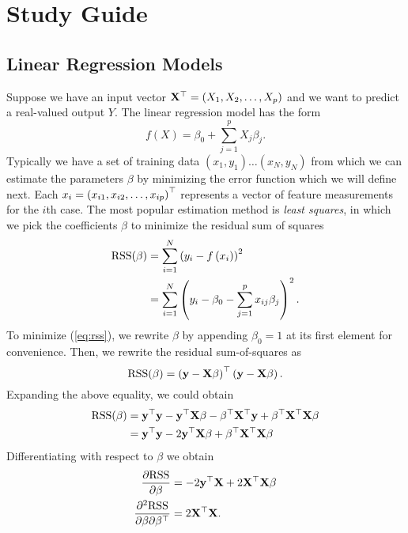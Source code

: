 \documentclass[info, crop, draft]{templates/Base}
\begin{document}
\chapter{Study Guide}
\section{Linear Regression Models}
Suppose we have an input vector ${\mathbf{X}}^\top = \left( X_1, X_2, \ldots, X_p \right)$ and we
want to predict a real-valued output $Y$. The linear regression model has the
form
\begin{equation}
    f(X) = \beta_0 + \sum_{j=1}^{p}X_j\beta_j.
\end{equation}
Typically we have a set of training data $(x_1, y_1) \ldots (x_N, y_N)$ from which
we can estimate the parameters $\beta$ by minimizing the error function which we
will define next. Each $x_i = \left( x_{i1}, x_{i2}, \ldots, x_{ip} \right)^\top$ represents
a vector of feature measurements for the $i$th case. The most popular estimation
method is \textit{least squares}, in which we pick the coefficients $\beta$ to
minimize the residual sum of squares
\begin{gather}
  \label{eq:rss}
  \begin{aligned}
    \text{RSS}(\beta) &= \sum_{i=1}^{N}\left( y_i - f\left( x_i \right) \right)^2 \\
    &= \sum_{i=1}^{N}\left(  y_i - \beta_0 - \sum_{j=1}^{p}x_{ij}\beta_j \right)^2.
  \end{aligned}
\end{gather}
To minimize (\ref{eq:rss}), we rewrite $\beta$ by appending $\beta_0 = 1$ at its
first element for convenience. Then, we rewrite the residual sum-of-squares as
\begin{equation}
  \text{RSS}(\beta) = \left( {\mathbf{y}} - {\mathbf{X}} \beta \right)^\top \left( {\mathbf{y}} - {\mathbf{X}} \beta \right).
\end{equation}
Expanding the above equality, we could obtain
\begin{gather}
  \begin{split}
  \text{RSS}(\beta) &= {\mathbf{y}}^\top {\mathbf{y}} - {\mathbf{y}}^\top {\mathbf{X}} \beta - \beta^\top{\mathbf{X}}^\top {\mathbf{y}}
  + \beta^\top {\mathbf{X}}^\top {\mathbf{X}} \beta \\
  &= {\mathbf{y}}^\top {\mathbf{y}} - 2{\mathbf{y}}^\top {\mathbf{X}} \beta + \beta^\top {\mathbf{X}}^\top {\mathbf{X}} \beta
  \end{split}
\end{gather}
Differentiating with respect to $\beta$ we obtain
\begin{gather}
  \begin{split}
    \frac{\partial \text{RSS}}{\partial \beta} &= -2{\mathbf{y}}^\top {\mathbf{X}} + 2{\mathbf{X}}^\top {\mathbf{X}} \beta \\
    \frac{\partial^2 \text{RSS}}{\partial \beta \partial \beta^\top} &= 2{\mathbf{X}}^\top {\mathbf{X}}.
  \end{split}
\end{gather}
\end{document}
